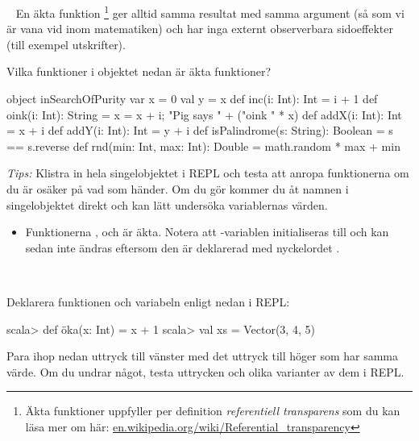 
\QUESTBEGIN

\Task  \what~  En äkta funktion%
\footnote{Äkta funktioner uppfyller per definition  \textit{referentiell transparens}  som du kan läsa mer om här:  \href{https://en.wikipedia.org/wiki/Referential_transparency}{en.wikipedia.org/wiki/Referential\_transparency}}
 ger alltid samma resultat med samma argument (så som vi är vana vid inom matematiken) och har inga externt observerbara sidoeffekter (till exempel utskrifter).

Vilka funktioner i objektet  nedan är äkta funktioner?
\begin{Code}
object inSearchOfPurity {
  var x = 0
  val y = x
  def inc(i: Int): Int = i + 1
  def oink(i: Int): String = { x = x + i; "Pig says " + ("oink " * x) }
  def addX(i: Int): Int = x + i
  def addY(i: Int): Int = y + i
  def isPalindrome(s: String): Boolean = s == s.reverse
  def rnd(min: Int, max: Int): Double = math.random * max + min
}
\end{Code}


\noindent\emph{Tips:} Klistra in hela singelobjektet i REPL och testa att anropa funktionerna om du är osäker på vad som händer. Om du gör  kommer du åt namnen i singelobjektet direkt och kan lätt undersöka variablernas värden.

\SOLUTION

\TaskSolved \what

\begin{itemize}
  \item Funktionerna  ,  och  är äkta. Notera att -variablen initialiseras till  och kan sedan inte ändras eftersom den är deklarerad med nyckelordet .
\end{itemize}

\QUESTEND



\QUESTBEGIN

\Task  \what~

\noindent Deklarera funktionen  och variabeln  enligt nedan i REPL:
\begin{REPL}
scala> def öka(x: Int) = x + 1
scala> val xs = Vector(3, 4, 5)
\end{REPL}
\noindent Para ihop nedan uttryck till vänster med det uttryck till höger som har samma värde. Om du undrar något, testa uttrycken och olika varianter av dem i REPL.

